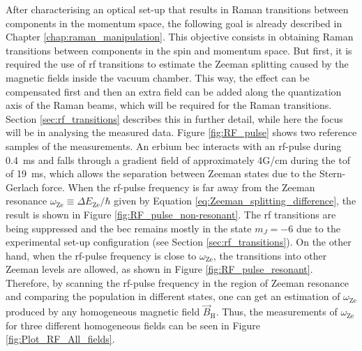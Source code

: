 After characterising an optical set-up that results in Raman transitions between components in the momentum space, the following goal is already described in Chapter \ref{chap:raman_manipulation}. This objective consists in obtaining Raman transitions between components in the spin and momentum space. But first, it is required the use of \ac{rf} transitions to estimate the Zeeman splitting caused by the magnetic fields inside the vacuum chamber. This way, the effect can be compensated first and then an extra field can be added along the quantization axis of the Raman beams, which will be required for the Raman transitions. Section \ref{sec:rf_transitions} describes this in further detail, while here the focus will be in analysing the measured data. Figure \ref{fig:RF_pulse} shows two reference samples of the measurements. An erbium \ac{bec} interacts with an \ac{rf}-pulse during \SI{0.4}{\milli\second} and falls through a gradient field of approximately 4G/cm during the \ac{tof} of \SI{19}{\milli\second}, which allows the separation between Zeeman states due to the Stern-Gerlach force. When the \ac{rf}-pulse frequency is far away from the Zeeman resonance $\omega_\text{Ze} \equiv \Delta E_{\text{Ze}}/\hbar$ given by Equation \ref{eq:Zeeman_splitting_difference}, the result is shown in Figure \ref{fig:RF_pulse_non-resonant}. The \ac{rf} transitions are being suppressed and the \ac{bec} remains mostly in the state $m_J=-6$ due to the experimental set-up configuration (see Section \ref{sec:rf_transitions}). On the other hand, when the \ac{rf}-pulse frequency is close to $\omega_\text{Ze}$, the transitions into other Zeeman levels are allowed, as shown in Figure \ref{fig:RF_pulse_resonant}. Therefore, by scanning the \ac{rf}-pulse frequency in the region of Zeeman resonance and comparing the population in different states, one can get an estimation of $\omega_\text{Ze}$ produced by any homogeneous magnetic field $\vec{B}_\text{H}$. Thus, the measurements of $\omega_\text{Ze}$ for three different homogeneous fields can be seen in Figure \ref{fig:Plot_RF_All_fields}.

